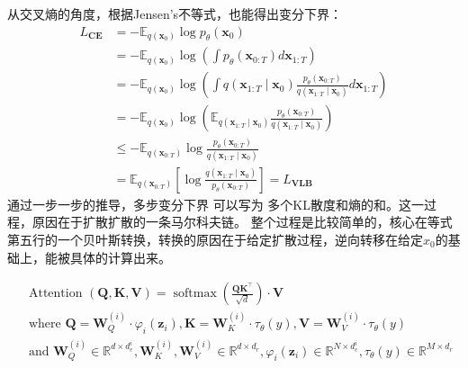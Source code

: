 \documentclass[lang=cn,newtx,10pt,scheme=chinese]{elegantbook}
\begin{document}
从交叉熵的角度，根据Jensen's不等式，也能得出变分下界：
\begin{equation}
  \begin{aligned} L_{\mathbf{CE}} 
    & =-\mathbb{E}_{q\left(\mathbf{x}_0\right)} \log p_\theta\left(\mathbf{x}_0\right) \\ 
    & =-\mathbb{E}_{q\left(\mathbf{x}_0\right)} \log \left(\int p_\theta\left(\mathbf{x}_{0: T}\right) d \mathbf{x}_{1: T}\right) \\ 
    & =-\mathbb{E}_{q\left(\mathbf{x}_0\right)} \log \left(\int q\left(\mathbf{x}_{1: T} \mid \mathbf{x}_0\right) \frac{p_\theta\left(\mathbf{x}_{0: T}\right)}{q\left(\mathbf{x}_{1: T} \mid \mathbf{x}_0\right)} d \mathbf{x}_{1: T}\right) \\ 
    & =-\mathbb{E}_{q\left(\mathbf{x}_0\right)} \log \left(\mathbb{E}_{q\left(\mathbf{x}_{1: T} \mid \mathbf{x}_0\right)} \frac{p_\theta\left(\mathbf{x}_{0: T}\right)}{q\left(\mathbf{x}_{1: T} \mid \mathbf{x}_0\right)}\right) \\ 
    & \leq-\mathbb{E}_{q\left(\mathbf{x}_{0: T}\right)} \log \frac{p_\theta\left(\mathbf{x}_{0: T}\right)}{q\left(\mathbf{x}_{1: T} \mid \mathbf{x}_0\right)} \\ 
    & =\mathbb{E}_{q\left(\mathbf{x}_{0: T}\right)}\left[\log \frac{q\left(\mathbf{x}_{1: T} \mid \mathbf{x}_0\right)}{p_\theta\left(\mathbf{x}_{0: T}\right)}\right]=L_{\mathbf{VLB}}
  \end{aligned}
\end{equation}
通过一步一步的推导，多步变分下界 可以写为 多个KL散度和熵的和。这一过程，原因在于扩散扩散的一条马尔科夫链。
整个过程是比较简单的，核心在等式第五行的一个贝叶斯转换，转换的原因在于给定扩散过程，逆向转移在给定$x_0$的基础上，能被具体的计算出来。

\begin{equation}
  \begin{aligned} & 
    \text { Attention }(\mathbf{Q}, \mathbf{K}, \mathbf{V})=\operatorname{softmax}\left(\frac{\mathbf{Q K}^{\top}}{\sqrt{d}}\right) \cdot \mathbf{V} \\ 
    & \text { where } \mathbf{Q}=\mathbf{W}_Q^{(i)} \cdot \varphi_i\left(\mathbf{z}_i\right), \mathbf{K}=\mathbf{W}_K^{(i)} \cdot \tau_\theta(y), \mathbf{V}=\mathbf{W}_V^{(i)} \cdot \tau_\theta(y) \\ 
    & \text { and } \mathbf{W}_Q^{(i)} \in \mathbb{R}^{d \times d_e^i}, \mathbf{W}_K^{(i)}, \mathbf{W}_V^{(i)} \in \mathbb{R}^{d \times d_r}, \varphi_i\left(\mathbf{z}_i\right) \in \mathbb{R}^{N \times d_c^i}, \tau_\theta(y) \in \mathbb{R}^{M \times d_r}
  \end{aligned}
\end{equation}
\end{document}
